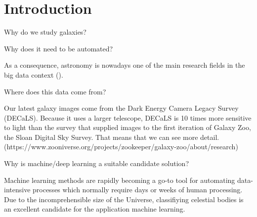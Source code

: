 \section{Introduction}

Why do we study galaxies?

Why does it need to be automated?

As a consequence, astronomy is nowadays one of the main research fields in the big data context (\citeauthor{microsoft-galaxies}).

Where does this data come from?

Our latest galaxy images come from the Dark Energy Camera Legacy Survey (DECaLS). Because it uses a larger telescope, DECaLS is 10 times more sensitive to light than the survey that supplied images to the first iteration of Galaxy Zoo, the Sloan Digital Sky Survey. That means that we can see more detail. (https://www.zooniverse.org/projects/zookeeper/galaxy-zoo/about/research)

Why is machine/deep learning a suitable candidate solution?

Machine learning methods are rapidly becoming a go-to tool for automating data-intensive processes which normally require days or weeks of human processing. Due to the incomprehensible size of the Universe, classifiying celestial bodies is an excellent candidate for the application machine learning.

